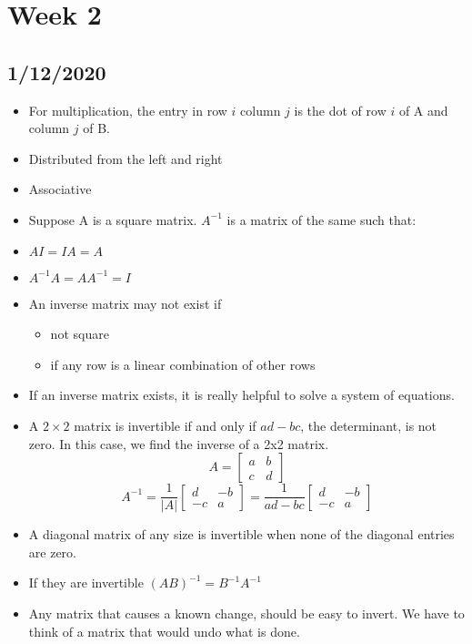 \section{Week 2}
\subsection{1/12/2020}
\begin{itemize}
    \item For multiplication, the entry in row $i$ column $j$ is the dot of row $i$ of A and column $j$ of B.
    \item Distributed from the left and right
    \item Associative
    \item Suppose A is a square matrix. $A^{-1}$ is a matrix of the same such that:
    \item $AI = IA = A$
    \item $A^{-1}A=AA^{-1}=I$
    \item An inverse matrix may not exist if
    \begin{itemize}
        \item not square
        \item if any row is a linear combination of other rows
    \end{itemize}
    \item If an inverse matrix exists, it is really helpful to solve a system of equations.
    \item A $2\times 2$ matrix is invertible if and only if $ad-bc$, the determinant, is not zero. In this case, we find the inverse of a 2x2 matrix.
    $$A=\begin{bmatrix}a&b\\c&d\end{bmatrix}$$
    $$A^{-1}=\frac{1}{|A|}\begin{bmatrix}d&-b\\-c&a\end{bmatrix}=\frac{1}{ad-bc}\begin{bmatrix}d&-b\\-c&a\end{bmatrix}$$
    \item A diagonal matrix of any size is invertible when none of the diagonal entries are zero.
    \item If they are invertible $(AB)^{-1} = B^{-1}A^{-1}$
    \item Any matrix that causes a known change, should be easy to invert. We have to think of a matrix that would undo what is done.

\end{itemize}
